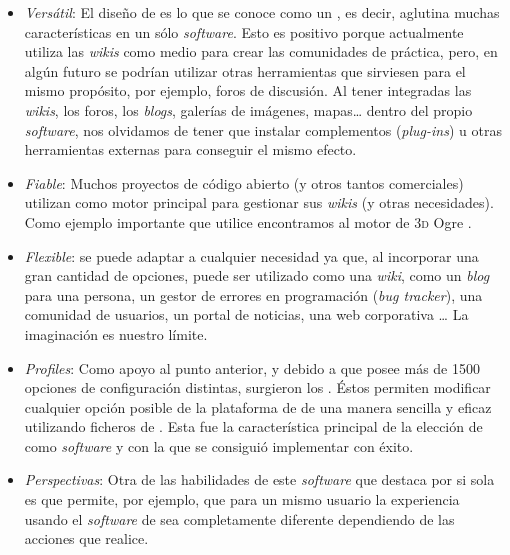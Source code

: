 \begin{itemize}
\item \textit{Versátil}: El diseño de \tiki{} es lo que se conoce como un , es decir, aglutina muchas características en un sólo \textit{software}. Esto es positivo porque actualmente \alma{} utiliza las \textit{wikis} como medio para crear las comunidades de práctica, pero, en algún futuro se podrían utilizar otras herramientas que sirviesen para el mismo propósito, por ejemplo, foros de discusión. Al tener \tiki{} integradas las \textit{wikis}, los foros, los \textit{blogs}, galerías de imágenes, mapas\ldots{} dentro del propio \textit{software}, nos olvidamos de tener que instalar complementos (\textit{plug-ins}) u otras herramientas externas para conseguir el mismo efecto.

\item \textit{Fiable}: Muchos proyectos de código abierto (y otros tantos comerciales) utilizan \tiki{} como motor principal para gestionar sus \textit{wikis} (y otras necesidades). Como ejemplo importante que utilice \tiki{} encontramos al motor de 3\textsc{d} Ogre \cite{web:ogre-tikiwiki, web:tikiwikis-destacadas}.

\item \textit{Flexible}: \tiki{} se puede adaptar a cualquier necesidad ya que, al incorporar una gran cantidad de opciones, puede ser utilizado como una \textit{wiki}, como un \textit{blog} para una persona, un gestor de errores en programación (\textit{bug tracker}),  una comunidad de usuarios, un portal de noticias, una web corporativa \cite{web:tiki-use-cases}\ldots{} La imaginación es nuestro límite.

\item \textit{Profiles}: Como apoyo al punto anterior, y debido a que \tiki{} posee más de 1500 opciones de configuración distintas, surgieron los \profiles{}. Éstos permiten modificar cualquier opción posible de la plataforma de \tiki{} de una manera sencilla y eficaz utilizando ficheros de . Esta fue la característica principal de la elección de \tiki{} como \textit{software} y con la que se consiguió implementar \alma{} con éxito.

\item \textit{Perspectivas}: Otra de las habilidades de este \textit{software} que destaca por si sola es que permite, por ejemplo, que para un mismo usuario la experiencia usando el \textit{software} de \tiki{} sea completamente diferente dependiendo de las acciones que realice.


\end{itemize}
